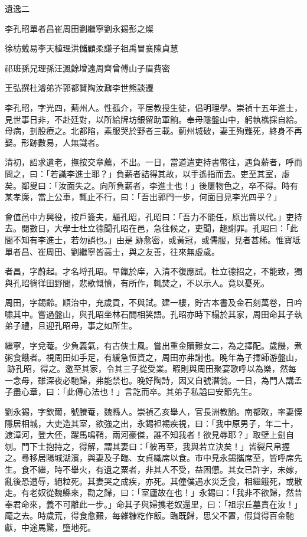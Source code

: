 
\begin{pinyinscope}
遺逸二

李孔昭單者昌崔周田劉繼寧劉永錫彭之燦

徐枋戴易李天植理洪儲顧柔謙子祖禹冒襄陳貞慧

祁班孫兄理孫汪渢餘增遠周齊曾傅山子眉費密

王弘撰杜濬弟岕郭都賢陶汝鼐李世熊談遷

李孔昭，字光四，薊州人。性孤介，平居教授生徒，倡明理學。崇禎十五年進士，見世事日非，不赴廷對，以所給牌坊銀留助軍餉。奉母隱盤山中，躬執樵採自給。母病，刲股療之。北都陷，素服哭於野者三載。薊州城破，妻王殉難死，終身不再娶。形跡數易，人無識者。

清初，詔求遺老，撫按交章薦，不出。一日，當道遣吏持書幣往，遇負薪者，呼而問之，曰：「若識李進士耶？」負薪者詰得其故，以手遙指而去。吏至其室，虛矣。鄰叟曰：「汝面失之。向所負薪者，李進士也！」後屢物色之，卒不得。時有某孝廉，當上公車，輒止不行，曰：「吾出郭門一步，何面目見李光四乎？」

會值邑中方興役，按戶簽夫，驅孔昭，孔昭曰：「吾力不能任，原出貲以代。」吏持去。閱數日，大學士杜立德聞孔昭在邑，急往候之，吏聞，趨謝罪。孔昭曰：「此間不知有李進士，若勿誤也。」由是跡愈密，或黃冠，或儒服，見者甚稀。惟寶坻單者昌、崔周田、劉繼寧皆高士，與之友善，往來無虛歲。

者昌，字蔚起。才名埒孔昭。早餼於庠，入清不復應試。杜立德招之，不能致，獨與孔昭徜徉田野間，悲歌慨憤，有所作，輒焚之，不以示人。竟以憂死。

周田，字錫齡。順治中，充歲貢，不與試。建一樓，貯古本書及金石刻萬卷，日吟嘯其中。嘗過盤山，與孔昭坐林石間相笑語。孔昭亦時下榻於其家，周田命其子執弟子禮，且迎孔昭母，事之如所生。

繼寧，字兌菴。少負義氣，有古俠士風。嘗出重金贖難女二，為之擇配。歲饑，煮粥食餓者。視周田如手足，有緩急恆資之，周田亦弗謝也。晚年為子擇師游盤山，跡孔昭，得之。邀至其家，令其三子從受業。暇則與周田聚宴歌呼以為樂，然每一念母，雖深夜必馳歸，弗能禁也。晚好陶詩，因又自號潛翁。一日，為門人講孟子盡心章，曰：「此傳心法也！」言訖而卒。其弟子私謚曰安節先生。

劉永錫，字欽爾，號賸菴，魏縣人。崇禎乙亥舉人，官長洲教諭。南都敗，率妻慄隱居相城，大吏造其室，欲強之出，永錫袒裼疾視，曰：「我中原男子，年二十，渡漳河，登大伾，躍馬鳴鞘，兩河豪傑，誰不知我者！欲見辱耶？」取壁上劍自刎。門下士抱持之，得解，謂其妻曰：「彼再至，我與若立決矣！」皆裂尺帛握之。尋移居陽城湖濱，與妻及子臨、女貞織席以食。市中見永錫攜席至，皆呼席先生。食不繼，時不舉火，有遺之粟者，非其人不受，益困憊。其女已許字，未嫁，亂後恐遭辱，絕粒死。其妻哭之成疾，亦死。其僮僕遇水災乏食，相繼餓死，或散走。有老奴從魏縣來，勸之歸，曰：「室廬故在也！」永錫曰：「我非不欲歸，然昔奉君命來，義不可離此一步。」命其子與婦攜老奴還里，曰：「祖宗丘墓責在汝！」麾之去。時歲荒，得食愈艱，每雜糠籺作飯。臨既歸，思父不置，假貸得百金馳獻，中途馬驚，墮地死。


\end{pinyinscope}
